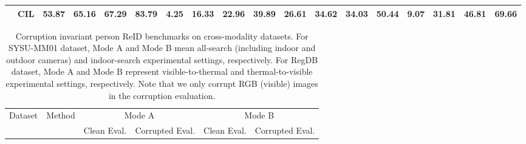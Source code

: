 \begin{table}[t]
\begin{tabular}{lc|cccc|cccc|cccc|cccc}
                                     & CIL                     & \textbf{53.87}                   & \textbf{65.16}                       & \textbf{67.29}                       & \textbf{83.79}                        & \textbf{4.25} & \textbf{16.33} & \textbf{22.96} & \textbf{39.89} & \textbf{26.61} & \textbf{34.62} & \textbf{34.03} & \textbf{50.44} & \textbf{9.07} & \textbf{31.81} & \textbf{46.81} & \textbf{69.66} \\
        \hline
    \end{tabular}
    \vspace{1mm}
    \label{tab:baseline}
\end{table}
 \setlength{\tabcolsep}{2.0pt}
\begin{table}[t]
    \scriptsize
    \renewcommand\arraystretch{1.5}
    \centering
    \caption{Corruption invariant person ReID benchmarks on cross-modality datasets. For SYSU-MM01 dataset, Mode A and Mode B mean all-search (including indoor and outdoor cameras) and indoor-search experimental settings, respectively. For RegDB dataset, Mode A and Mode B represent visible-to-thermal and thermal-to-visible experimental settings, respectively. Note that we only corrupt RGB (visible) images in the corruption evaluation.}
    \vspace{1mm}
    \begin{tabular}{lc|cccc|cccc|cccc|cccc}
        \hline
        \multirow{3}{*}{Dataset}   & \multirow{3}{*}{Method} & \multicolumn{8}{c|}{Mode A}      & \multicolumn{8}{c}{Mode B}                                                                                                                                                                                                                                                                                         \\
        \cline{3-18}
                                   &                         & \multicolumn{4}{c|}{Clean Eval.} & \multicolumn{4}{c|}{Corrupted Eval.} & \multicolumn{4}{c|}{Clean Eval.} & \multicolumn{4}{c}{Corrupted
            Eval.}                                                                                                                                                                                                                                                                                                                                                                                                   \\


\end{tabular}
\end{table}
